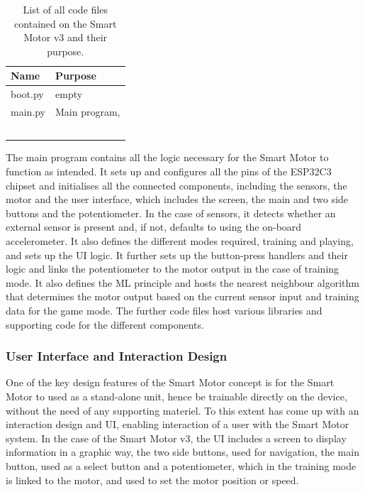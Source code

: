 \begin{table}[H]
    \centering
    \begin{tabular}{|l|l|}
        \hline
        \textbf{Name} & \textbf{Purpose} \\
        \hline
        boot.py & empty \\
        \hline
        main.py & Main program,  \\
        \hline
         &  \\
        \hline
         &  \\
        \hline
         &  \\
        \hline
         &  \\
        \hline
         &  \\
        \hline
    \end{tabular}
    \vspace{\ftspace}
    \caption{List of all code files contained on the Smart Motor v3 and their purpose.}
    \label{tab:smv3_code_list}
\end{table}

The main program contains all the logic necessary for the Smart Motor to function as intended. It sets up and configures all the pins of the ESP32C3 chipset and initialises all the connected components, including the sensors, the motor and the user interface, which includes the screen, the main and two side buttons and the potentiometer. In the case of sensors, it detects whether an external sensor is present and, if not, defaults to using the on-board accelerometer. It also defines the different modes required, training and playing, and sets up the UI logic. It further sets up the button-press handlers and their logic and links the potentiometer to the motor output in the case of training mode. It also defines the ML principle and hosts the nearest neighbour algorithm that determines the motor output based on the current sensor input and training data for the game mode.
The further code files host various libraries and supporting code for the different components.

\subsubsection{\label{sec:methods_sm_ui}User Interface and Interaction Design}

One of the key design features of the Smart Motor concept is for the Smart Motor to used as a stand-alone unit, hence be trainable directly on the device, without the need of any supporting materiel. To this extent \citet[]{dahal_designing_2024} has come up with an interaction design and UI, enabling interaction of a user with the Smart Motor system. In the case of the Smart Motor v3, the UI includes a screen to display information in a graphic way, the two side buttons, used for navigation, the main button, used as a select button and a potentiometer, which in the training mode is linked to the motor, and used to set the motor position or speed.

